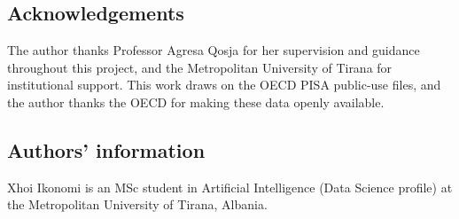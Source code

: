 \documentclass[11pt,a4paper]{article}
\begin{document}
\subsection*{Acknowledgements}
The author thanks Professor Agresa Qosja for her supervision and guidance throughout this
project, and the Metropolitan University of Tirana for institutional support. This work draws on the
OECD PISA public-use files, and the author thanks the OECD for making these data openly
available.

\subsection*{Authors' information}
Xhoi Ikonomi is an MSc student in Artificial Intelligence (Data Science profile) at the
Metropolitan University of Tirana, Albania.



\end{document}

